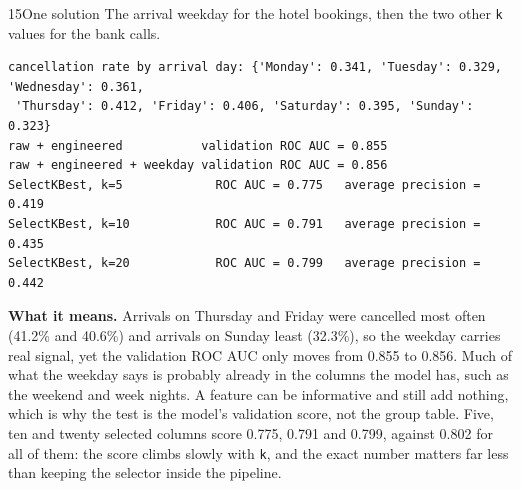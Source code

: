 \begin{labquestion}{15}{One solution}
The arrival weekday for the hotel bookings, then the two other \texttt{k} values for the bank calls.
\end{labquestion}
\begin{labanswer}

\begin{refoutput}
\begin{lstlisting}[style=utpterminal]
cancellation rate by arrival day: {'Monday': 0.341, 'Tuesday': 0.329, 'Wednesday': 0.361,
 'Thursday': 0.412, 'Friday': 0.406, 'Saturday': 0.395, 'Sunday': 0.323}
raw + engineered           validation ROC AUC = 0.855
raw + engineered + weekday validation ROC AUC = 0.856
SelectKBest, k=5             ROC AUC = 0.775   average precision = 0.419
SelectKBest, k=10            ROC AUC = 0.791   average precision = 0.435
SelectKBest, k=20            ROC AUC = 0.799   average precision = 0.442
\end{lstlisting}
\end{refoutput}

\textbf{What it means.} Arrivals on Thursday and Friday were cancelled most often (41.2\% and 40.6\%) and arrivals on Sunday least (32.3\%), so the weekday carries real signal, yet the validation ROC AUC only moves from 0.855 to 0.856. Much of what the weekday says is probably already in the columns the model has, such as the weekend and week nights. A feature can be informative and still add nothing, which is why the test is the model's validation score, not the group table. Five, ten and twenty selected columns score 0.775, 0.791 and 0.799, against 0.802 for all of them: the score climbs slowly with \texttt{k}, and the exact number matters far less than keeping the selector inside the pipeline.
\end{labanswer}


